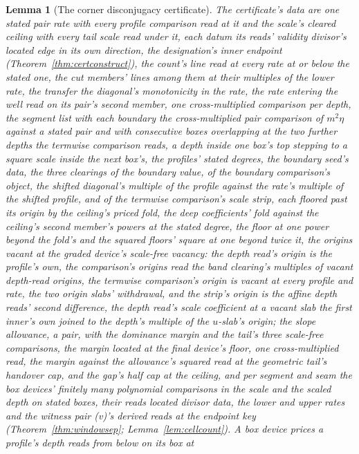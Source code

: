 \documentclass[11pt]{article}
\newtheorem{lemma}{Lemma}
\theoremstyle{definition}
\begin{document}
\begin{lemma}[The corner disconjugacy certificate]
The certificate's data are one stated pair
rate with every profile comparison read at it and the scale's
cleared ceiling with every tail scale read under it, each datum
its reads' validity divisor's located edge in its own direction,
the designation's inner endpoint
(Theorem~\ref{thm:certconstruct}), the count's line
read at every rate at or below the stated one, the cut members'
lines among them at their multiples of the lower rate, the
transfer the diagonal's monotonicity in the rate, the rate
entering the well read on its pair's second member, one
cross-multiplied comparison per depth, the segment
list
with each boundary the cross-multiplied pair comparison of
$m^{2}\eta$ against a stated pair and with consecutive boxes
overlapping at the two further depths the termwise comparison
reads, a depth inside one box's top stepping to a square scale
inside the next box's, the profiles' stated degrees, the boundary
seed's data, the three clearings of the boundary value, of the
boundary comparison's object, the shifted diagonal's multiple of
the profile against the rate's multiple of the shifted profile,
and of the termwise comparison's scale strip, each floored past
its origin by the ceiling's priced fold, the deep coefficients'
fold against the ceiling's second member's powers at the stated
degree, the floor at one power beyond the fold's and the squared
floors' square at one beyond twice it, the origins vacant at
the graded device's scale-free vacancy: the depth read's origin is
the profile's own, the comparison's origins read the band
clearing's multiples of vacant depth-read origins, the termwise
comparison's origin is vacant at every profile and rate, the two
origin slabs' withdrawal, and the strip's origin is the affine
depth reads' second difference, the depth read's scale
coefficient at a vacant slab the first inner's own joined to the
depth's multiple of the $u$-slab's origin; the slope
\emph{allowance}, a pair, with the dominance
\emph{margin} and the tail's
three scale-free comparisons, the margin located at the final
device's floor, one cross-multiplied read, the
margin against the allowance's squared read at the geometric
tail's handover cap, and the gap's half cap at the ceiling, and
per
segment and seam the box devices' finitely many polynomial
comparisons in the scale and the scaled depth on stated boxes,
their reads located divisor data, the lower and upper rates and
the witness pair
(v)'s derived reads at the endpoint key
(Theorem~\ref{thm:windowsep}; Lemma~\ref{lem:cellcount}). A box
device prices a profile's depth reads from below on its box at

\end{lemma}
\end{document}
